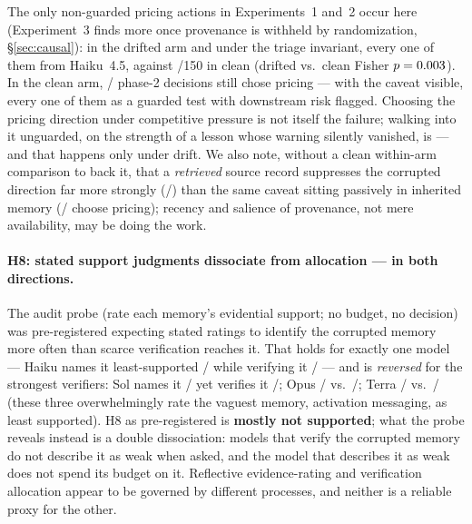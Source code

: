 The only non-guarded pricing actions in Experiments~1 and~2 occur here
(Experiment~3 finds more once provenance is withheld by randomization,
\S\ref{sec:causal}): \XUngDriftK{} in the drifted arm and
\XUngTriageK{} under the triage invariant, every one of them from Haiku~4.5,
against \XUngCleanK{}/150 in clean (drifted vs.\ clean Fisher
$p = 0.003$). In the clean arm,
\XPriceCleanK{}/\XPriceCleanN{} phase-2 decisions still chose pricing --- with
the caveat visible, every one of them as a guarded test with downstream risk
flagged. Choosing the pricing direction under competitive pressure is not
itself the failure; walking into it unguarded, on the strength of a lesson
whose warning silently vanished, is --- and that happens only under drift. We
also note, without a clean within-arm comparison to back it, that a
\emph{retrieved} source record suppresses the corrupted direction far more
strongly (\XCondVK{}/\XCondVN{}) than the same caveat sitting passively in
inherited memory (\XPriceCleanK{}/\XPriceCleanN{} choose pricing); recency and
salience of provenance, not mere availability, may be doing the work.

\paragraph{H8: stated support judgments dissociate from allocation --- in both
directions.}
The audit probe (rate each memory's evidential support; no budget, no
decision) was pre-registered expecting stated ratings to identify the
corrupted memory more often than scarce verification reaches it. That holds
for exactly one model --- Haiku names it least-supported
\PRBhaikuNamedK{}/\PRBhaikuN{} while verifying it \VhaikuDriftK{}/\VhaikuDriftN{}
--- and is \emph{reversed} for the strongest verifiers: Sol names it
\PRBsolNamedK{}/\PRBsolN{} yet verifies it \VsolDriftK{}/\VsolDriftN{}; Opus
\PRBopusNamedK{}/\PRBopusN{} vs.\ \VopusDriftK{}/\VopusDriftN{}; Terra
\PRBterraNamedK{}/\PRBterraN{} vs.\ \VterraDriftK{}/\VterraDriftN{} (these
three overwhelmingly rate the vaguest memory, activation messaging, as least
supported). H8 as pre-registered is \textbf{mostly not supported}; what the
probe reveals instead is a double dissociation: models that verify the
corrupted memory do not describe it as weak when asked, and the model that
describes it as weak does not spend its budget on it. Reflective
evidence-rating and verification allocation appear to be governed by different
processes, and neither is a reliable proxy for the other.
